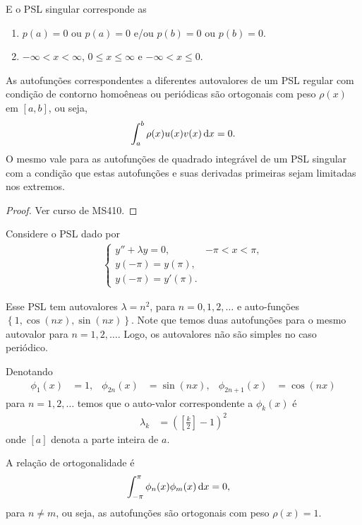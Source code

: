 E o PSL singular corresponde as
\begin{enumerate}
    \item $p(a) = 0$ ou $p(a) = 0$ e/ou $p(b) = 0$ ou $p(b) = 0$.
    \item $-\infty < x < \infty$, $0 \leq x \leq \infty$ e $-\infty < x \leq 0$.
\end{enumerate}

\begin{teo}
    As autofunções correspondentes a diferentes autovalores de um PSL regular com condição de contorno homoêneas ou periódicas são ortogonais com peso $\rho(x)$ em $[a,b]$, ou seja,
    \begin{align*}
        \int_a^b \rho(x) u(x) v(x) \, \mathrm{d}x = 0.
    \end{align*}
    O mesmo vale para as autofunções de quadrado integrável de um PSL singular com a condição que estas autofunções e suas derivadas primeiras sejam limitadas nos extremos.
\end{teo}
\begin{proof}
    Ver curso de MS410.
\end{proof}
\begin{exem}
    Considere o PSL dado por
    \begin{align*}
        \begin{cases}
            y'' + \lambda y = 0, & -\pi < x < \pi, \\
            y(-\pi) = y(\pi), \\
            y(-\pi) = y'(\pi).
        \end{cases}
    \end{align*}

    Esse PSL tem autovalores $\lambda = n^2$, para $n = 0, 1, 2, \ldots$ e auto-funções $\left\{ 1, \cos\left( n x \right), \sin\left( n x \right) \right\}$. Note que temos duas autofunções para o mesmo autovalor para $n = 1, 2, \ldots$. Logo, os autovalores não são simples no caso periódico.

    Denotando
    \begin{align*}
        \phi_1(x) &= 1, & \phi_{2n}(x) &= \sin\left( n x \right), & \phi_{2n + 1}(x) &= \cos\left( n x \right)
    \end{align*}
    para $n = 1, 2, \ldots$ temos que o auto-valor correspondente a $\phi_k(x)$ é
    \begin{align*}
        \lambda_k &= \left( \left[ \frac{k}{2} \right] - 1 \right)^2
    \end{align*}
    onde $\left[ a \right]$ denota a parte inteira de $a$.

    A relação de ortogonalidade é
    \begin{align*}
        \int_{-\pi}^\pi \phi_n(x) \phi_m(x) \, \mathrm{d}x &= 0,
    \end{align*}
    para $n \neq m$, ou seja, as autofunções são ortogonais com peso $\rho(x) = 1$.
\end{exem}
